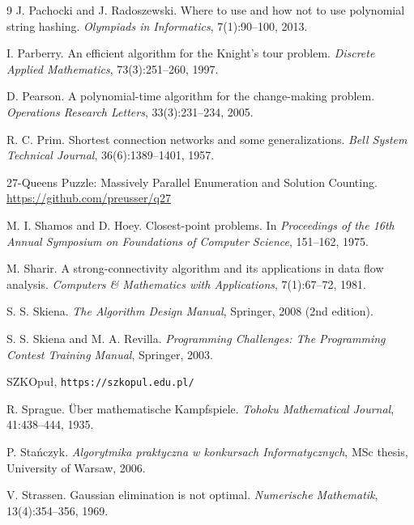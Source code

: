 \begin{thebibliography}{9}
  J. Pachocki and J. Radoszewski.
  Where to use and how not to use polynomial string hashing.
  \emph{Olympiads in Informatics}, 7(1):90--100, 2013.

  I. Parberry.
  An efficient algorithm for the Knight's tour problem.
  \emph{Discrete Applied Mathematics}, 73(3):251--260, 1997.


  D. Pearson.
  A polynomial-time algorithm for the change-making problem.
  \emph{Operations Research Letters}, 33(3):231--234, 2005.

  R. C. Prim.
  Shortest connection networks and some generalizations.
  \emph{Bell System Technical Journal}, 36(6):1389--1401, 1957.


  27-Queens Puzzle: Massively Parallel Enumeration and Solution Counting.
  \url{https://github.com/preusser/q27}

  M. I. Shamos and D. Hoey.
  Closest-point problems.
  In \emph{Proceedings of the 16th Annual Symposium on Foundations of Computer Science}, 151--162, 1975.

  M. Sharir.
  A strong-connectivity algorithm and its applications in data flow analysis.
  \emph{Computers \& Mathematics with Applications}, 7(1):67--72, 1981.

  S. S. Skiena.
  \emph{The Algorithm Design Manual}, Springer, 2008 (2nd edition).

  S. S. Skiena and M. A. Revilla.
  \emph{Programming Challenges: The Programming Contest Training Manual},
  Springer, 2003.

  SZKOpuł, \texttt{https://szkopul.edu.pl/}

  R. Sprague.
  Über mathematische Kampfspiele.
  \emph{Tohoku Mathematical Journal}, 41:438--444, 1935.

  P. Stańczyk.
  \emph{Algorytmika praktyczna w konkursach Informatycznych},
  MSc thesis, University of Warsaw, 2006.

  V. Strassen.
  Gaussian elimination is not optimal.
  \emph{Numerische Mathematik}, 13(4):354--356, 1969.


\end{thebibliography}

